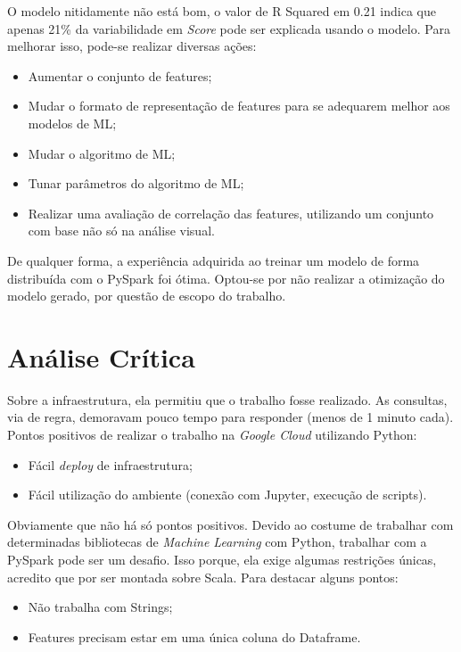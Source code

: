\documentclass{article}
\begin{document}
O modelo nitidamente não está bom, o valor de R Squared em 0.21 indica que apenas 21\% da variabilidade em \emph{Score} pode ser explicada usando o modelo. Para melhorar isso, pode-se realizar diversas ações:

\begin{itemize}
    \item Aumentar o conjunto de features;
    \item Mudar o formato de representação de features para se adequarem melhor aos modelos de ML;
    \item Mudar o algoritmo de ML;
    \item Tunar parâmetros do algoritmo de ML;
    \item Realizar uma avaliação de correlação das features, utilizando um conjunto com base não só na análise visual.
\end{itemize}

De qualquer forma, a experiência adquirida ao treinar um modelo de forma distribuída com o PySpark foi ótima. Optou-se por não realizar a otimização do modelo gerado, por questão de escopo do trabalho.

\newpage
\section{Análise Crítica}
\label{sect:critic_anal}

Sobre a infraestrutura, ela permitiu que o trabalho fosse realizado. As consultas, via de regra, demoravam pouco tempo para responder (menos de 1 minuto cada). Pontos positivos de realizar o trabalho na \emph{Google Cloud} utilizando Python:

\begin{itemize}
    \item Fácil \emph{deploy} de infraestrutura;
    \item Fácil utilização do ambiente (conexão com Jupyter, execução de scripts).
\end{itemize}

Obviamente que não há só pontos positivos. Devido ao costume de trabalhar com determinadas bibliotecas de \emph{Machine Learning} com Python, trabalhar com a PySpark pode ser um desafio. Isso porque, ela exige algumas restrições únicas, acredito que por ser montada sobre Scala. Para destacar alguns pontos:

\begin{itemize}
    \item Não trabalha com Strings;
    \item Features precisam estar em uma única coluna do Dataframe.
\end{itemize}
\end{document}
